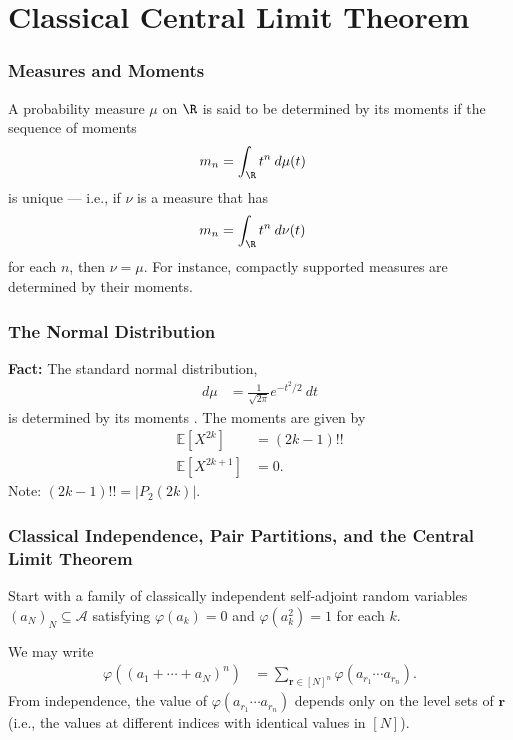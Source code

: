 \documentclass{beamer}
\begin{document}
\section{Classical Central Limit Theorem}%
\begin{frame}
  \frametitle{Measures and Moments}
  A probability measure $\mu$ on $\R$ is said to be determined by its moments if the sequence of moments
  \begin{align*}
    m_n &= \int_{\R}^{} t^n\:d\mu(t)
  \end{align*}
  is unique --- i.e., if $\nu$ is a measure that has
  \begin{align*}
    m_n &= \int_{\R}^{} t^{n}\:d\nu(t)
  \end{align*}
  for each $n$, then $\nu = \mu$. For instance, compactly supported measures are determined by their moments.
\end{frame}
\begin{frame}
  \frametitle{The Normal Distribution}
  \textbf{Fact:} The standard normal distribution,
  \begin{align*}
    d\mu &= \frac{1}{\sqrt{2\pi}} e^{-t^2/2}\:dt
  \end{align*}
  is determined by its moments \cite[Example 30.1]{billingsley_probability_and_measure}. The moments are given by
  \begin{align*}
    \mathbb{E}\left[ X^{2k} \right] &= \left( 2k-1 \right)!!\\
    \mathbb{E}\left[ X^{2k+1} \right] &= 0.
  \end{align*}
  Note: $\left( 2k-1 \right)!! = \left\vert P_2\left( 2k \right) \right\vert$.
\end{frame}
\begin{frame}
  \frametitle{Classical Independence, Pair Partitions, and the Central Limit Theorem}
  Start with a family of classically independent self-adjoint random variables $\left( a_N \right)_N\subseteq \mathcal{A}$ satisfying $\varphi\left( a_k \right) = 0$ and $\varphi\left( a_k^2 \right) = 1$ for each $k$.\newline\pause

  We may write
  \begin{align*}
    \varphi\left( \left( a_1 + \cdots + a_N \right)^{n} \right) &= \sum_{ \mathbf{r}\in \left[ N \right]^{n} } \varphi\left( a_{r_1}\cdots a_{r_n} \right).
  \end{align*}
  From independence, the value of $\varphi\left( a_{r_1}\cdots a_{r_n} \right)$ depends only on the level sets of $ \mathbf{r} $ (i.e., the values at different indices with identical values in $\left[ N \right]$).
\end{frame}
\end{document}
